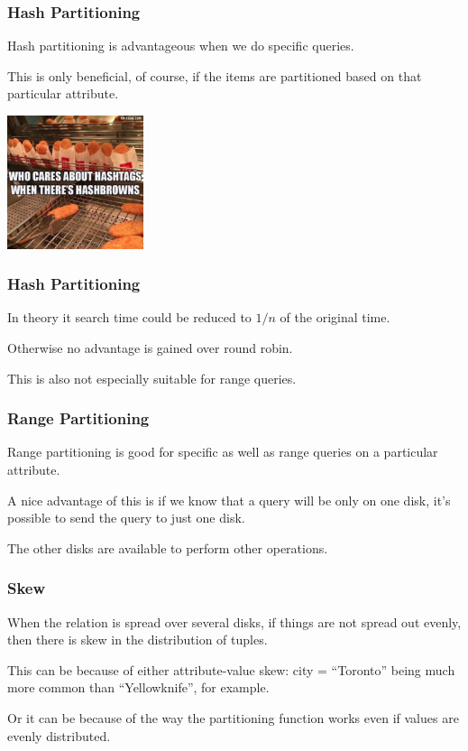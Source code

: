 \begin{frame}
\frametitle{Hash Partitioning}

Hash partitioning is advantageous when we do specific queries. 

This is only beneficial, of course, if the items are partitioned based on that particular attribute. 

\begin{center}
	\includegraphics[width=0.3\textwidth]{images/hashbrown.jpg}
\end{center}

\end{frame}

\begin{frame}
\frametitle{Hash Partitioning}
In theory it search time could be reduced to $1/n$ of the original time. 

Otherwise no advantage is gained over round robin. 

This is also not especially suitable for range queries.

\end{frame}

\begin{frame}
\frametitle{Range Partitioning}

Range partitioning is good for specific as well as range queries on a particular attribute. 

A nice advantage of this is if we know that a query will be only on one disk, it's possible to send the query to just one disk.

The other disks are available to perform other operations.


\end{frame}

\begin{frame}
\frametitle{Skew}

When the relation is spread over several disks, if things are not spread out evenly, then there is \alert{skew} in the distribution of tuples. 


This can be because of either \alert{attribute-value} skew: city = ``Toronto'' being much more common than ``Yellowknife'', for example.

Or it can be because of the way the partitioning function works even if values are evenly distributed.
\end{frame}


